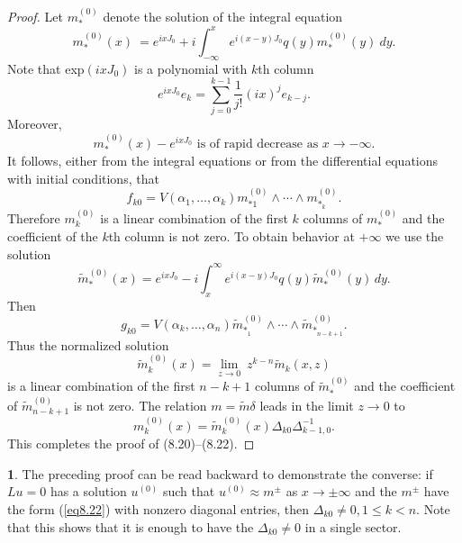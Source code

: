 \documentclass{surv-l}
\theoremstyle{plain}
\theoremstyle{definition}
\newtheorem{remark}[theorem]{\sc{Remark}}
\numberwithin{equation}{chapter}
\begin{document}
\begin{proof} Let $m_{*}^{(0)}$ denote the solution of the integral equation
\begin{equation}\label{eq8.23}
m_{*}^{(0)}(x)\ =e^{i xJ_{0}}+i  \int_{-\infty}^{x}e^{i(x-y)J_{0}}q(y)m_{*}^{(0)}(y)\ dy.
\end{equation}
Note that exp$(ixJ_{0})$ is a polynomial with $k$th column
\begin{equation*}
e^{ixJ_{0}}e_{k}=\sum_{j=0}^{k-1}\frac{1}{j!}(ix)^{j}e_{k-j}.
\end{equation*}
Moreover,
\begin{equation*}
m_{*}^{(0)}(x)-e^{ixJ_{0}} \text{ is of rapid decrease as } x \rightarrow-\infty.
\end{equation*}
It follows, either from the integral equations or from the differential equations with initial conditions, that
\begin{equation*}
f_{k0}=V(\alpha_{1},\ldots, \alpha_{k})m_{*1}^{(0)}\wedge\cdots \wedge m_{*_{k}}^{(0)}.
\end{equation*}
Therefore $m_{k}^{(0)}$ is a linear combination of the first $k$ columns of $m_{*}^{(0)}$ and the coefficient of the $k$th column is not zero. To obtain behavior at $+\infty$ we use the solution
\begin{equation}\label{eq8.24}
\tilde{m}_{*}^{(0)}(x)=e^{ixJ_{0}}-i\int_{x}^{\infty}e^{i(x-y)J_{0}}q(y)\tilde{m}_{*}^{(0)}(y)\,dy.
\end{equation}
Then
\begin{equation*}
g_{k0}=V(\alpha_{k},\ldots, \alpha_{n})\tilde{m}_{*_{1}}^{(0)}\wedge\cdots \wedge\tilde{m}_{*_{n-k+1}}^{(0)}.
\end{equation*}
Thus the normalized solution
\begin{equation*}
\tilde{m}_{k}^{(0)}(x)=\lim_{z\rightarrow 0}\ z^{k-n}\tilde{m}_{k}(x,z)
\end{equation*}
is a linear combination of the first $n-k+1$ columns of $\tilde{m}_{*}^{(0)}$ and the coefficient of $\tilde{m}_{n-k+1}^{(0)}$ is not zero. The relation $ m=\tilde{m}\delta$ leads in the limit $z\rightarrow 0$ to
\begin{equation*}
m_{k}^{(0)}(x) =\tilde{m}_{k}^{(0)}(x)\Delta_{k0}\Delta_{k-1,0}^{-1}.
\end{equation*}
This completes the proof of (8.20)--(8.22).
\end{proof}
\setcounter{theorem}{24}
\begin{remark}\label{rem8.25} The preceding proof can be read backward to demonstrate the converse: if $Lu=0$ has a solution $u^{(0)}$ such that $u^{(0)}\approx m^{\pm}$ as $ x\rightarrow\pm\infty$ and the $m^{\pm}$ have the form (\ref{eq8.22}) with nonzero diagonal entries, then $\Delta_{k0}\neq 0, 1\leq k<n$. Note that this shows that it is enough to have the $\Delta_{k0}\neq 0$ in a single sector.
\end{remark}
\end{document}
